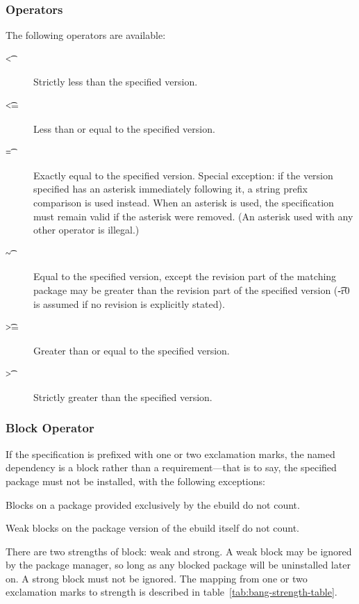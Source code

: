 \subsubsection{Operators}
\label{sec:dep-operator}

The following operators are available:

\begin{description}
\item[\t{<}] Strictly less than the specified version.
\item[\t{<=}] Less than or equal to the specified version.
\item[\t{=}] Exactly equal to the specified version. Special exception: if the version
    specified has an asterisk immediately following it, a string prefix comparison is
    used instead. When an asterisk is used, the specification must remain valid if the
    asterisk were removed. (An asterisk used with any other operator is illegal.)
\item[\t{\textasciitilde}] Equal to the specified version, except the revision part of the matching
    package may be greater than the revision part of the specified version (\t{-r0} is
    assumed if no revision is explicitly stated).
\item[\t{>=}] Greater than or equal to the specified version.
\item[\t{>}] Strictly greater than the specified version.
\end{description}

\subsubsection{Block Operator}

If the specification is prefixed with one or two exclamation marks, the named dependency is a block
rather than a requirement---that is to say, the specified package must not be installed, with the
following exceptions:

\begin{compactitem}
\item Blocks on a package provided exclusively by the ebuild do not count. \label{provided-blocks}
\item Weak blocks on the package version of the ebuild itself do not count.
\end{compactitem}

 There are two strengths of block: weak and strong. A weak block may be
ignored by the package manager, so long as any blocked package will be uninstalled later on. A
strong block must not be ignored. The mapping from one or two exclamation marks to strength is
described in table~\ref{tab:bang-strength-table}.


